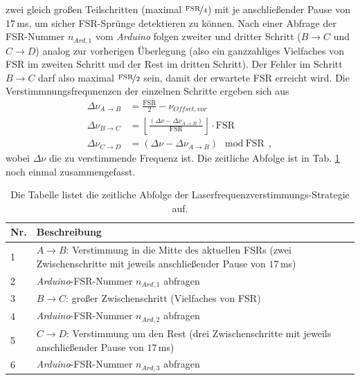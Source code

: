 zwei gleich großen Teilschritten (maximal $\nicefrac{\text{FSR}}{4}$) mit je
anschließender Pause von $17\,$ms, um sicher FSR-Sprünge detektieren zu können.
Nach einer Abfrage der FSR-Nummer $n_{Ard,1}$ vom \textit{Arduino} folgen zweiter und dritter Schritt ($B\rightarrow C$ und $C\rightarrow D$) analog zur
vorherigen Überlegung (also ein ganzzahliges Vielfaches von FSR im zweiten
Schritt und der Rest im dritten Schritt). Der Fehler im Schritt $B\rightarrow C$
darf also maximal $\nicefrac{\text{FSR}}{2}$ sein, damit der erwartete FSR erreicht wird. Die Verstimmnungsfrequnenzen der einzelnen Schritte ergeben sich aus
\begin{equation}\label{eq:scan-strategie_schritte}
	\begin{split}
		\Delta\nu_{A\rightarrow B}&=\frac{\text{FSR}}{2}-\nu_{Offset,vor}\\
		\Delta\nu_{B\rightarrow
		C}&=\left\lfloor\frac{(\Delta\nu-\Delta\nu_{A\rightarrow
		B})}{\text{FSR}}\right\rfloor\cdot\text{FSR}\\
		\Delta\nu_{C\rightarrow D}&=(\Delta\nu-\Delta\nu_{A\rightarrow
		B})\mod\text{FSR}\,,
	\end{split}
\end{equation}
wobei $\Delta\nu$ die zu verstimmende Frequenz ist.
Die zeitliche Abfolge ist in Tab. \ref{tab:scan-strategie_abfolge} noch einmal
zusammengefasst.
\begin{table}
	\begin{tabular}{p{}p{}}
		\toprule
			Nr. & Beschreibung \\
		\midrule[1px]
		\hline
			1 & $A\rightarrow B$: Verstimmung in die Mitte des aktuellen FSRs (zwei
			Zwischenschritte mit jeweils anschließender Pause von $17\,$ms)\\
			2 & \textit{Arduino}-FSR-Nummer $n_{Ard,1}$ abfragen\\
			3 & $B\rightarrow C$: großer Zwischenschritt (Vielfaches von FSR)\\
			4 & \textit{Arduino}-FSR-Nummer $n_{Ard,2}$ abfragen\\
			5 & $C\rightarrow D$: Verstimmung um den Rest (drei Zwischenschritte mit
			jeweils anschließender Pause von $17\,$ms)\\
			6 & \textit{Arduino}-FSR-Nummer $n_{Ard,3}$ abfragen\\
		\bottomrule[1px]
	\end{tabular}
	\caption[Laserfrequenzverstimmungs-Strategie]{Die Tabelle listet die zeitliche
	Abfolge der Laserfrequenzverstimmungs-Strategie auf.}
	\label{tab:scan-strategie_abfolge}
\end{table}
